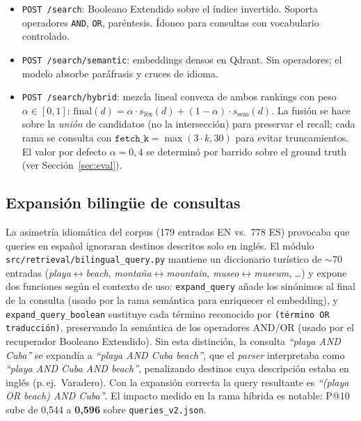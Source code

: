 \documentclass[runningheads,a4paper]{llncs}
\begin{document}
\begin{itemize}
\item \texttt{POST /search}: Booleano Extendido sobre el \'indice invertido. Soporta operadores \texttt{AND}, \texttt{OR}, par\'entesis. \'Idoneo para consultas con vocabulario controlado.
\item \texttt{POST /search/semantic}: embeddings densos en Qdrant. Sin operadores; el modelo absorbe par\'afrasis y cruces de idioma.
\item \texttt{POST /search/hybrid}: mezcla lineal convexa de ambos rankings con peso $\alpha \in [0,1]$: $\text{final}(d) = \alpha\cdot s_{\text{l\'ex}}(d) + (1-\alpha)\cdot s_{\text{sem}}(d)$. La fusi\'on se hace sobre la \emph{uni\'on} de candidatos (no la intersecci\'on) para preservar el recall; cada rama se consulta con $\texttt{fetch\_k}{=}\max(3\cdot k, 30)$ para evitar truncamientos. El valor por defecto $\alpha{=}0{,}4$ se determin\'o por barrido sobre el ground truth (ver Secci\'on~\ref{sec:eval}).
\end{itemize}

\subsection{Expansi\'on bilingüe de consultas}

La asimetr\'ia idiom\'atica del corpus (179 entradas EN vs.\ 778 ES) provocaba que queries en espa\~nol ignoraran destinos descritos solo en ingl\'es. El m\'odulo \texttt{src/retrieval/bilingual\_query.py} mantiene un diccionario tur\'istico de $\sim$70 entradas (\emph{playa$\leftrightarrow$beach}, \emph{monta\~na$\leftrightarrow$mountain}, \emph{museo$\leftrightarrow$museum}, \dots) y expone dos funciones seg\'un el contexto de uso: \texttt{expand\_query} a\~nade los sin\'onimos al final de la consulta (usado por la rama sem\'antica para enriquecer el embedding), y \texttt{expand\_query\_boolean} sustituye cada t\'ermino reconocido por \texttt{(t\'ermino OR traducci\'on)}, preservando la sem\'antica de los operadores AND/OR (usado por el recuperador Booleano Extendido). Sin esta distinci\'on, la consulta \emph{``playa AND Cuba''} se expand\'ia a \emph{``playa AND Cuba beach''}, que el \emph{parser} interpretaba como \emph{``playa AND Cuba AND beach''}, penalizando destinos cuya descripci\'on estaba en ingl\'es (p.\,ej.\ Varadero). Con la expansi\'on correcta la query resultante es \emph{``(playa OR beach) AND Cuba''}. El impacto medido en la rama h\'ibrida es notable: P@10 sube de 0{,}544 a \textbf{0{,}596} sobre \texttt{queries\_v2.json}.
\end{document}
